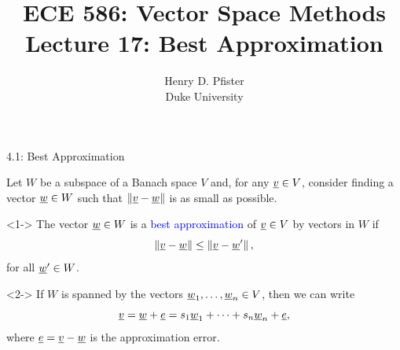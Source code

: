 \documentclass[10pt,english,aspectratio=169]{beamer}
\begin{document}
\title{ECE 586: Vector Space Methods \\ Lecture 17: Best Approximation}
\author{Henry D. Pfister \\ Duke University}
\date{}


\begin{frame}[plain]
	\titlepage
	
\end{frame}

\addtocounter{framenumber}{-1}

\begin{frame}{4.1: Best Approximation}

Let $W$ be a subspace of a Banach space $V$ and, for any $\underline{v} \in V$, consider finding a vector $\underline{w} \in W$ such that $\left\| \underline{v} - \underline{w} \right\|$ is as small as possible.
\begin{definition}<1->
The vector $\underline{w} \in W$ is a \textcolor{blue}{best approximation} of $\underline{v} \in V$ by vectors in $W$ if \vspace{-1.5mm}
\begin{equation*}
\left\| \vecnot{v} - \vecnot{w} \right\| \leq \left\| \vecnot{v} - \vecnot{w}' \right\|, \vspace{-2.5mm}
\end{equation*}
for all $\underline{w}' \in W$.
\end{definition}

\begin{example}<2->
If $W$ is spanned by the vectors $\underline{w}_1, \ldots, \underline{w}_n \in V$, then we can write \vspace{-1.5mm}
\begin{equation*}
\vecnot{v} = \vecnot{w} + \vecnot{e} = s_1 \vecnot{w}_1 + \cdots + s_n \vecnot{w}_n + \vecnot{e}, \vspace{-1.5mm}
\end{equation*}
where $\underline{e} = \underline{v}-\underline{w}$ is the approximation error.
\end{example}
\end{frame}
\end{document}
